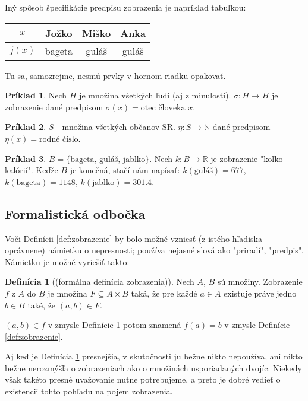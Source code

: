 \documentclass{article}
\theoremstyle{definition}
\newtheorem{definition}{Definícia}
\newtheorem{example}{Príklad}
\theoremstyle{plain}
\theoremstyle{remark}
\begin{document}
Iný spôsob špecifikácie predpisu zobrazenia je napríklad tabuľkou:
\begin{center}
\begin{tabular}{c|ccc}
    $x$ & Jožko & Miško & Anka \\
    \hline
    $j(x)$ & bageta & guláš & guláš
\end{tabular}
\end{center}
Tu sa, samozrejme, nesmú prvky v hornom riadku opakovať.

\begin{example}
Nech $H$ je množina všetkých ľudí (aj z minulosti).
$\sigma \colon H \rightarrow H$ je zobrazenie dané predpisom $\sigma(x) = \text{otec človeka } x$.
\end{example}

\begin{example}
$S$ - množina všetkých občanov SR.
$\eta \colon S \rightarrow \mathbb{N}$ dané predpisom $\eta(x) = \text{rodné číslo}$.
\end{example}

\begin{example}
$B = \{\text{bageta, guláš, jablko}\}$. Nech $k \colon B \rightarrow \mathbb{R}$ je zobrazenie "koľko kalórií".
Keďže $B$ je konečná, stačí nám napísať:
$k(\text{guláš}) = 677$, $k(\text{bageta}) = 1148$, $k(\text{jablko}) = 301.4$.
\end{example}

\subsection*{Formalistická odbočka}
Voči Definícii \ref{def:zobrazenie} by bolo možné vzniesť (z istého hľadiska oprávnene) námietku o nepresnosti; používa nejasné slová ako
"priradí", "predpis". Námietku je možné vyriešiť takto:

\begin{definition}[(formálna definícia zobrazenia)]\label{def:zobrazenieFormal}
Nech $A$, $B$ sú množiny. Zobrazenie $f$ z $A$ do $B$ je množina $F \subseteq A \times B$ taká, že pre každé $a \in A$ existuje práve jedno $b \in B$ také, že $(a,b) \in F$.
\end{definition}

$(a,b) \in f$ v zmysle Definície \ref{def:zobrazenieFormal} potom znamená $f(a)=b$ v zmysle Definície
\ref{def:zobrazenie}.

Aj keď je Definícia \ref{def:zobrazenieFormal} presnejšia, v skutočnosti ju bežne nikto nepoužíva, ani nikto bežne
nerozmýšľa o zobrazeniach ako o množinách usporiadaných dvojíc. Niekedy však takéto presné uvažovanie nutne potrebujeme, a preto je dobré vedieť o existencii tohto pohľadu na pojem zobrazenia.
\end{document}
